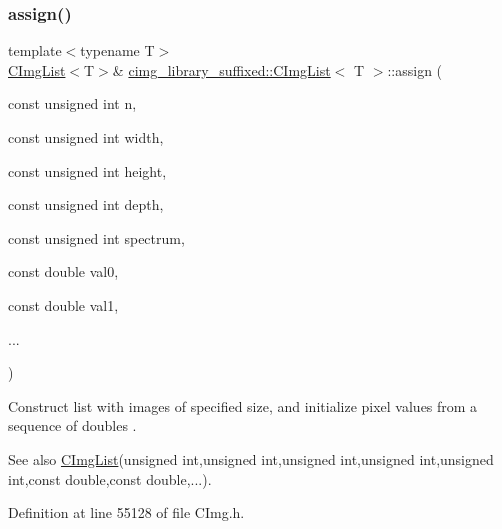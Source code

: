 \subsubsection{\texorpdfstring{assign()}{assign()}\hspace{0.1cm}{\footnotesize\ttfamily [6/18]}}
{\footnotesize\ttfamily template$<$typename T$>$ \\
\hyperlink{structcimg__library__suffixed_1_1CImgList}{C\+Img\+List}$<$T$>$\& \hyperlink{structcimg__library__suffixed_1_1CImgList}{cimg\+\_\+library\+\_\+suffixed\+::\+C\+Img\+List}$<$ T $>$\+::assign (\begin{DoxyParamCaption}\item[{const unsigned int}]{n,  }\item[{const unsigned int}]{width,  }\item[{const unsigned int}]{height,  }\item[{const unsigned int}]{depth,  }\item[{const unsigned int}]{spectrum,  }\item[{const double}]{val0,  }\item[{const double}]{val1,  }\item[{}]{... }\end{DoxyParamCaption})\hspace{0.3cm}{\ttfamily [inline]}}



Construct list with images of specified size, and initialize pixel values from a sequence of doubles . 

\begin{DoxySeeAlso}{See also}
\hyperlink{structcimg__library__suffixed_1_1CImgList}{C\+Img\+List}(unsigned int,unsigned int,unsigned int,unsigned int,unsigned int,const double,const double,...). 
\end{DoxySeeAlso}


Definition at line 55128 of file C\+Img.\+h.

\mbox{\label{structcimg__library__suffixed_1_1CImgList_a4ea4b85cfebafa021b27e30ef8743d6f}} 
